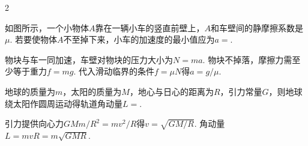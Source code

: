\begin{paracol}{2}
\begin{problem}
    如图所示，一个小物体$A$靠在一辆小车的竖直前壁上，$A$和车壁间的静摩擦系数是$\mu$. 若要使物体$A$不至掉下来，小车的加速度的最小值应为$a=$.
    \switchcolumn\vspace*{\fill}\centering
    \vspace*{\fill}
\end{problem}\switchcolumn
{}
\begin{solution}
    物块与车一同加速，车壁对物块的压力大小为$N=ma$. 物块不掉落，摩擦力需至少等于重力$f=mg$. 代入滑动临界的条件$f=\mu N$得$a=g/\mu$.
\end{solution}
\end{paracol}

\begin{problem}
    地球的质量为$m$，太阳的质量为$M$，地心与日心的距离为$R$，引力常量$G$，则地球绕太阳作圆周运动得轨道角动量$L=$.
\end{problem}
\begin{solution}
    引力提供向心力$GMm/R^2=mv^2/R$得$v=\sqrt{GM/R}$. 角动量$L=mvR=m\sqrt{GMR}$.
\end{solution}

